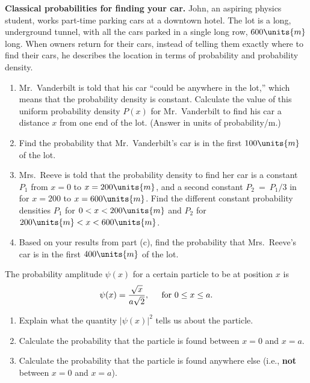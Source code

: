 
\begin{problem}
{\bf Classical probabilities for finding your car.}  John, an aspiring
physics student, works part-time parking cars at a downtown hotel.
The lot is a long, underground tunnel, with all the cars parked in a
single long row, $600\units{m}$ long.  When owners return for their
cars, instead of telling them exactly where to find their cars, he
describes the location in terms of probability and probability
density.
\label{prob:parking_lot_1}
   \begin{enumerate}
   \item Mr.~Vanderbilt is told that his car ``could be anywhere in
     the lot,'' which means that the probability density is constant.
     Calculate the value of this uniform probability density $P(x)$
     for Mr.~Vanderbilt to find his car a distance $x$ from one end of
     the lot.  (Answer in units of probability/m.)
    \item Find the probability that Mr.~Vanderbilt's car is in the first 
     $100\units{m}$ of the lot.
    \item Mrs.~Reeve is told that the probability density to find her
      car is a constant $P_1$ from $x = 0$ to $x=200\units{m}$, and
      a second constant \mbox{$P_2$ = $P_1/3$} in for $x=200$ to 
      $x=600\units{m}$.  Find the different constant probability densities
      $P_1$ for $0 < x < 200\units{m}$ and $P_2$ for $200\units{m}
      < x < 600\units{m}$.
     \item Based on your results from part (c), find the probability
       that Mrs.~Reeve's car is in the first $400\units{m}$ of the
       lot.
     \end{enumerate}
\end{problem}

\newpage


\begin{problem}
The probability amplitude $\psi(x)$ for a certain particle to be at 
position $x$ is
\[ 
\psi(x) = 
\frac{\sqrt{x}}{a\sqrt{2}}, \hspace{0.2in}\text{for $0\leq x \leq a$.}
\]
\begin{enumerate}
\item Explain what the quantity $|\psi(x)|^2$ tells us about the particle.

\item Calculate the probability that the particle is found between $x=0$ 
and $x = a$. 

\item Calculate the probability that the particle is found anywhere else
(i.e., {\bf not} between $x=0$ and $x=a$).
\end{enumerate}
\end{problem}

